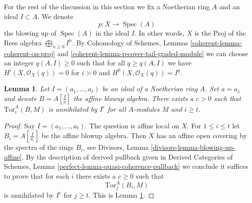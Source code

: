 \documentclass[10pt,a4paper]{amsart}
\theoremstyle{plain}
\newtheorem{lemma}[subsection]{Lemma}
\theoremstyle{definition}
\theoremstyle{remark}
\numberwithin{equation}{subsection}
\def\Spec{\mathop{\mathrm{Spec}}}
\begin{document}
\noindent
For the rest of the discussion in this section we fix a Noetherian ring $A$
and an ideal $I \subset A$. We denote
$$
p : X \to \Spec(A)
$$
the blowing up of $\Spec(A)$ in the ideal $I$. In other words, $X$ is the
$\text{Proj}$ of the Rees algebra $\bigoplus_{n \geq 0} I^n$.
By Cohomology of Schemes, Lemmas \ref{coherent-lemma-coherent-on-proj} and
\ref{coherent-lemma-recover-tail-graded-module}
we can choose an integer $q(A, I) \geq 0$ such that for all $q \geq q(A, I)$
we have $H^i(X, \mathcal{O}_X(q)) = 0$ for
$i > 0$ and $H^0(X, \mathcal{O}_X(q)) = I^q$.

\begin{lemma}
\label{lemma-annihilates-affine}
Let $I = (a_1, \ldots, a_t)$ be an ideal of a Noetherian ring $A$.
Set $a = a_1$ and denote $B = A[\frac{I}{a}]$ the affine blowup algebra.
There exists a $c > 0$ such that $\text{Tor}_i^A(B, M)$ is annihilated
by $I^c$ for all $A$-modules $M$ and $i \geq t$.
\end{lemma}

\begin{proof}
Say $I = (a_1, \ldots, a_t)$. The question is affine local on $X$.
For $1 \leq i \leq t$ let $B_i = A[\frac{I}{a_i}]$ be the affine
blowup algebra. Then $X$ has an affine open covering by
the spectra of the rings $B_i$, see
Divisors, Lemma \ref{divisors-lemma-blowing-up-affine}.
By the description of derived pullback given in
Derived Categories of Schemes, Lemma
\ref{perfect-lemma-quasi-coherence-pullback}
we conclude it suffices to prove that for each $i$ there exists a $c \geq 0$
such that
$$
\text{Tor}_j^A(B_i, M)
$$
is annihilated by $I^c$ for $j \geq t$. This is
Lemma \ref{lemma-annihilates-affine}.
\end{proof}
\end{document}
